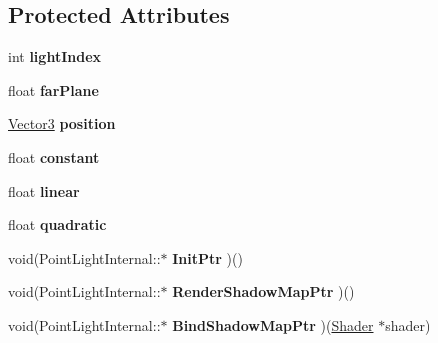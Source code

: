 \subsection*{Protected Attributes}
\begin{DoxyCompactItemize}
\item 
\hypertarget{classBrickware_1_1Graphics_1_1PointLightInternal_a12a778a9bb135c07f690f64a94eeefe4}{}int {\bfseries light\+Index}\label{classBrickware_1_1Graphics_1_1PointLightInternal_a12a778a9bb135c07f690f64a94eeefe4}

\item 
\hypertarget{classBrickware_1_1Graphics_1_1PointLightInternal_adf2219c177ba582d2565eae19a530d5e}{}float {\bfseries far\+Plane}\label{classBrickware_1_1Graphics_1_1PointLightInternal_adf2219c177ba582d2565eae19a530d5e}

\item 
\hypertarget{classBrickware_1_1Graphics_1_1PointLightInternal_a2de2f6beb9596f2f572c0243c7cba828}{}\hyperlink{classBrickware_1_1Math_1_1Vector3}{Vector3} {\bfseries position}\label{classBrickware_1_1Graphics_1_1PointLightInternal_a2de2f6beb9596f2f572c0243c7cba828}

\item 
\hypertarget{classBrickware_1_1Graphics_1_1PointLightInternal_a562e62961c599dce6bf8a98f88d95b76}{}float {\bfseries constant}\label{classBrickware_1_1Graphics_1_1PointLightInternal_a562e62961c599dce6bf8a98f88d95b76}

\item 
\hypertarget{classBrickware_1_1Graphics_1_1PointLightInternal_a1452cd40f7d66f43d864e9eac6f92a36}{}float {\bfseries linear}\label{classBrickware_1_1Graphics_1_1PointLightInternal_a1452cd40f7d66f43d864e9eac6f92a36}

\item 
\hypertarget{classBrickware_1_1Graphics_1_1PointLightInternal_a4364be6c218128d078778b12dedf093b}{}float {\bfseries quadratic}\label{classBrickware_1_1Graphics_1_1PointLightInternal_a4364be6c218128d078778b12dedf093b}

\item 
\hypertarget{classBrickware_1_1Graphics_1_1PointLightInternal_a768f5cf2b39357035daedd64a16a6030}{}void(Point\+Light\+Internal\+::$\ast$ {\bfseries Init\+Ptr} )()\label{classBrickware_1_1Graphics_1_1PointLightInternal_a768f5cf2b39357035daedd64a16a6030}

\item 
\hypertarget{classBrickware_1_1Graphics_1_1PointLightInternal_a3de2121aa3ea89cb8c41586fed8c880b}{}void(Point\+Light\+Internal\+::$\ast$ {\bfseries Render\+Shadow\+Map\+Ptr} )()\label{classBrickware_1_1Graphics_1_1PointLightInternal_a3de2121aa3ea89cb8c41586fed8c880b}

\item 
\hypertarget{classBrickware_1_1Graphics_1_1PointLightInternal_ab2389a2c1b86199d0fd6a62fefcebb06}{}void(Point\+Light\+Internal\+::$\ast$ {\bfseries Bind\+Shadow\+Map\+Ptr} )(\hyperlink{classBrickware_1_1Graphics_1_1Shader}{Shader} $\ast$shader)\label{classBrickware_1_1Graphics_1_1PointLightInternal_ab2389a2c1b86199d0fd6a62fefcebb06}

\end{DoxyCompactItemize}
